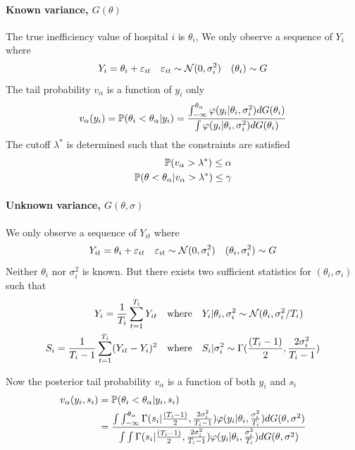 \documentclass[12pt]{article}
\begin{document}
\paragraph{Known variance, $G(\theta)$}
The true inefficiency value of hospital $i$ is $\theta_i$, We only observe a
sequence of $Y_{i}$ where
\begin{equation*}
    Y_{i} = \theta_i + \varepsilon_{it} \quad \varepsilon_{it} \sim \mathcal{N}(0,\sigma_i^2) \quad (\theta_i) \sim G
\end{equation*}
The tail probability $v_\alpha$ is a function of $y_i$ only
\begin{equation*}
    v_\alpha(y_i) =\mathbb{P}(\theta_i<\theta_\alpha|y_i) =\frac{\int_{-\infty}^{\theta_\alpha} \varphi(y_i|\theta_i,\sigma_i^2)dG(\theta_i)}{\int \varphi(y_i|\theta_i,\sigma_i^2)dG(\theta_i)}
\end{equation*}
The cutoff $\lambda^*$ is determined such that the constraints are satisfied
\begin{align*}
    \mathbb{P}(v_\alpha>\lambda^*) \le \alpha \\
    \mathbb{P}(\theta<\theta_\alpha|v_\alpha>\lambda^*) \le \gamma
\end{align*}

\paragraph{Unknown variance, $G(\theta,\sigma)$}
We only observe a sequence of $Y_{it}$ where
\begin{equation*}
    Y_{it} = \theta_i + \varepsilon_{it} \quad \varepsilon_{it} \sim \mathcal{N}(0,\sigma_i^2) \quad (\theta_i,\sigma_i^2) \sim G
\end{equation*}
Neither $\theta_i$ nor $\sigma_i^2$ is known. But there exists two sufficient statistics for $(\theta_i,\sigma_i)$ such that
\begin{align*}
    Y_i=\frac{1}{T_i}\sum_{t=1}^{T_i}Y_{it}           & \quad \text{where}\quad Y_i|\theta_i,\sigma_i^2 \sim \mathcal{N}(\theta_i,\sigma_i^2/T_i)              \\
    S_i=\frac{1}{T_i-1}\sum_{t=1}^{T_i}(Y_{it}-Y_i)^2 & \quad \text{where} \quad S_i|\sigma_i^2 \sim \Gamma(\frac{(T_i-1)}{2},\frac{2\sigma_i^2}{T_i-1})
\end{align*}

Now the posterior tail probability $v_\alpha$ is a function of both $y_i$ and
$s_i$
\begin{align*}
    v_\alpha(y_i,s_i) & =\mathbb{P}(\theta_i<\theta_\alpha|y_i,s_i)                                                                                                                                                                                                                                                                \\
                      & =\frac{\int\int_{-\infty}^{\theta_\alpha} \Gamma(s_i|\frac{(T_i-1)}{2},\frac{2\sigma_i^2}{T_i-1})\varphi(y_i|\theta_i,\frac{\sigma_i^2}{T_i})dG(\theta,\sigma^2)}{\int\int \Gamma(s_i|\frac{(T_i-1)}{2},\frac{2\sigma_i^2}{T_i-1})\varphi(y_i|\theta_i,\frac{\sigma_i^2}{T_i})dG(\theta,\sigma^2)} \\
\end{align*}
\end{document}
